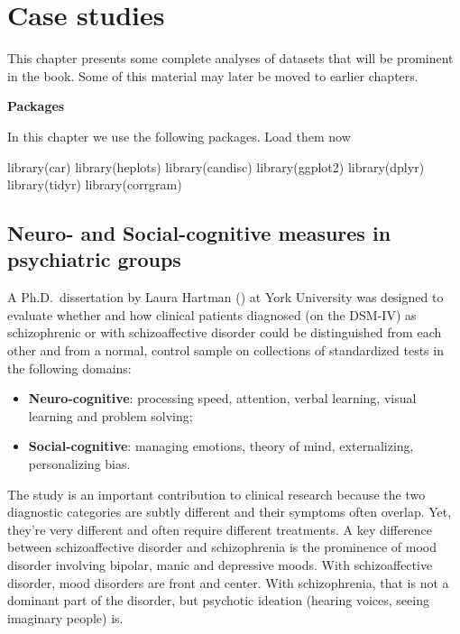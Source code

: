\documentclass[
  letterpaper,
  10pt,
  krantz2]{krantz}
\makeatletter
\newenvironment{Shaded}{\begin{snugshade}}{\end{snugshade}}
\newcommand{\FunctionTok}[1]{\textcolor[rgb]{0.28,0.35,0.67}{#1}}
\newcommand{\NormalTok}[1]{\textcolor[rgb]{0.00,0.23,0.31}{#1}}
\newenvironment{kframe}{%
  \medskip{}
  \setlength{\fboxsep}{.8em}
  \def\at@end@of@kframe{}%
  \ifinner\ifhmode%
  \def\at@end@of@kframe{\end{minipage}}%
  \begin{minipage}{\columnwidth}%
  \fi\fi%
  \def\FrameCommand##1{\hskip\@totalleftmargin \hskip-\fboxsep
  \colorbox{shadecolor}{##1}\hskip-\fboxsep
      \hskip-\linewidth \hskip-\@totalleftmargin \hskip\columnwidth}%
  \MakeFramed {\advance\hsize-\width
    \@totalleftmargin\z@ \linewidth\hsize
    \@setminipage}}%
{\par\unskip\endMakeFramed%
  \at@end@of@kframe}
\renewenvironment{Shaded}{\begin{kframe}}{\end{kframe}}
\makeatother
\begin{document}
\chapter{Case studies}\label{case-studies}

This chapter presents some complete analyses of datasets that will be
prominent in the book. Some of this material may later be moved to
earlier chapters.

\textbf{Packages}

In this chapter we use the following packages. Load them now

\begin{Shaded}
\begin{Highlighting}[]
\FunctionTok{library}\NormalTok{(car)}
\FunctionTok{library}\NormalTok{(heplots)}
\FunctionTok{library}\NormalTok{(candisc)}
\FunctionTok{library}\NormalTok{(ggplot2)}
\FunctionTok{library}\NormalTok{(dplyr)}
\FunctionTok{library}\NormalTok{(tidyr)}
\FunctionTok{library}\NormalTok{(corrgram)}
\end{Highlighting}
\end{Shaded}

\section{Neuro- and Social-cognitive measures in psychiatric
groups}\label{neuro--and-social-cognitive-measures-in-psychiatric-groups}

A Ph.D.~dissertation by Laura Hartman
() at York University was designed to
evaluate whether and how clinical patients diagnosed (on the DSM-IV) as
schizophrenic or with schizoaffective disorder could be distinguished
from each other and from a normal, control sample on collections of
standardized tests in the following domains:

\begin{itemize}
\item
  \textbf{Neuro-cognitive}: processing speed, attention, verbal
  learning, visual learning and problem solving;
\item
  \textbf{Social-cognitive}: managing emotions, theory of mind,
  externalizing, personalizing bias.
\end{itemize}

The study is an important contribution to clinical research because the
two diagnostic categories are subtly different and their symptoms often
overlap. Yet, they're very different and often require different
treatments. A key difference between schizoaffective disorder and
schizophrenia is the prominence of mood disorder involving bipolar,
manic and depressive moods. With schizoaffective disorder, mood
disorders are front and center. With schizophrenia, that is not a
dominant part of the disorder, but psychotic ideation (hearing voices,
seeing imaginary people) is.
\end{document}
